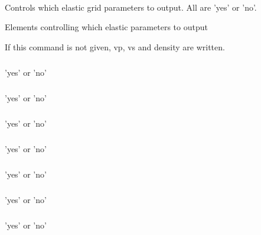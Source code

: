 \paragraph{}
 \slist
   \item \Description Controls which elastic grid parameters to output. All are 'yes' or 'no'.
   \item \Argument Elements controlling which elastic parameters to output
   \item \Default If this command is not given, vp, vs and density are written.
 \elist

\subparagraph{}
 \slist
   \item \Description
   \item \Argument 'yes' or 'no'
   \item \Default
 \elist

\subparagraph{}
 \slist
   \item \Description
   \item \Argument 'yes' or 'no'
   \item \Default
 \elist

\subparagraph{}
 \slist
   \item \Description
   \item \Argument 'yes' or 'no'
   \item \Default
 \elist

\subparagraph{}
 \slist
   \item \Description
   \item \Argument 'yes' or 'no'
   \item \Default
 \elist


\subparagraph{}
 \slist
   \item \Description
   \item \Argument 'yes' or 'no'
   \item \Default
 \elist

\subparagraph{}
 \slist
   \item \Description
   \item \Argument 'yes' or 'no'
   \item \Default
 \elist

\subparagraph{}
 \slist
   \item \Description
   \item \Argument 'yes' or 'no'
   \item \Default
 \elist

